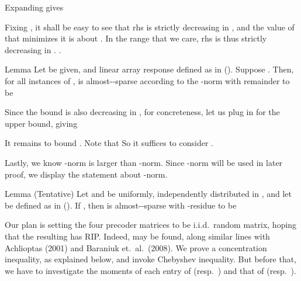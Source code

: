 Expanding  gives

Fixing , it shall be easy to see that rhs is strictly decreasing in , and the value of  that minimizes it is about .
In the range that we care, rhs is thus strictly decreasing in .
.

\Result
{Lemma}
{
Let  be given, and linear array response  defined as in ().
Suppose .
Then, for all instances of \m {\f},  is almost--sparse according to the -norm with remainder  to be
}

Since the bound is also decreasing in , for concreteness, let us plug in  for the upper bound, giving

\stopsection

\startsection [title={Almost-Sparsity of Channel Response \m {\M{H}}}]

It remains to bound .
Note that
So it suffices to consider .


Lastly, we know -norm is larger than -norm.
Since -norm will be used in later proof, we display the statement about -norm.

\Result
{Lemma (Tentative)}
{
Let  and  be uniformly, independently distributed in \m {[0,2\pi)}, and let  be defined as in ().
If , then  is almost--sparse with -residue  to be
}

\stopsection

\startsection [title={Moments of Precoders' and Combiners' entries}]

Our plan is setting the four precoder matrices to be i.i.d.\ random matrix, hoping that the resulting  has RIP.
Indeed,  may be found, along similar lines with Achlioptas (2001) and Baraniuk et.\ al.\ (2008).
We prove a concentration inequality, as explained below, and invoke Chebyshev inequality.
But before that, we have to investigate the moments of each entry of  (resp.\ ) and that of  (resp.\ ).

